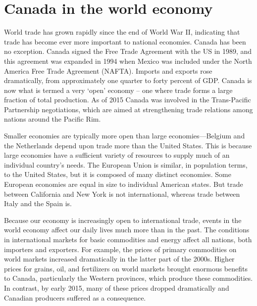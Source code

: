 \section{Canada in the world economy}\label{sec:ch15sec2}

World trade has grown rapidly since the end of World War II, indicating that
trade has become ever more important to national economies. Canada has been
no exception. Canada signed the Free Trade Agreement with the US in 1989,
and this agreement was expanded in 1994 when Mexico was included under the
North America Free Trade Agreement (NAFTA). Imports and exports rose
dramatically, from approximately one quarter to forty percent of GDP. Canada
is now what is termed a very `open' economy -- one where trade forms a large
fraction of total production. As of 2015 Canada was involved in the
Trans-Pacific Partnership negotiations, which are aimed at strengthening
trade relations among nations around the Pacific Rim.

Smaller economies are typically more open than large economies---Belgium and
the Netherlands depend upon trade more than the United States. This is
because large economies have a sufficient variety of resources to supply
much of an individual country's needs. The European Union is similar, in
population terms, to the United States, but it is composed of many distinct
economies. Some European economies are equal in size to individual American
states. But trade between California and New York is not international,
whereas trade between Italy and the Spain is.

Because our economy is increasingly open to international trade, events in
the world economy affect our daily lives much more than in the past. The
conditions in international markets for basic commodities and energy affect
all nations, both importers and exporters. For example, the prices of
primary commodities on world markets increased dramatically in the latter
part of the 2000s. Higher prices for grains, oil, and fertilizers on world
markets brought enormous benefits to Canada, particularly the Western
provinces, which produce these commodities. In contrast, by early 2015, many
of these prices dropped dramatically and Canadian producers suffered as a
consequence. 

